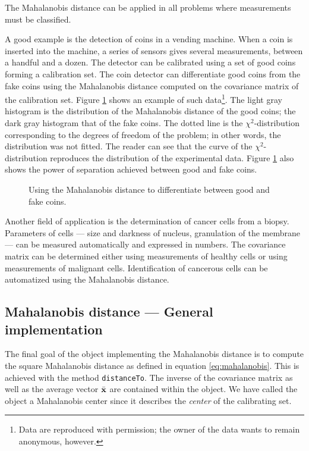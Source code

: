 \documentclass[twoside]{book}
\begin{document}
 \noindent The Mahalanobis distance can
be applied in all problems where measurements must be classified.

A good example is the detection of coins in a vending machine.
When a coin is inserted into the machine, a series of sensors
gives several measurements, between a handful and a dozen. The
detector can be calibrated using a set of good coins forming a
calibration set. The coin detector can differentiate good coins
from the fake coins using the Mahalanobis distance computed on the
covariance matrix of the calibration set. Figure
\ref{fig:mahalanobis} shows an example of such data\footnote{Data
are reproduced with permission; the owner of the data wants to
remain anonymous, however.}. The light gray histogram is the
distribution of the Mahalanobis distance of the good coins; the
dark gray histogram that of the fake coins. The dotted line is the
$\chi^2$-distribution corresponding to the degrees of freedom of
the problem; in other words, the distribution was not fitted. The
reader can see that the curve of the $\chi^2$-distribution
reproduces the distribution of the experimental data. Figure
\ref{fig:mahalanobis} also shows the power of separation achieved
between good and fake coins.
\begin{figure}
\center{}
\caption{Using the Mahalanobis distance to differentiate between
good and fake coins.}\label{fig:mahalanobis}
\end{figure}


Another field of application is the determination of cancer cells
from a biopsy. Parameters of cells --- size and darkness of
nucleus, granulation of the membrane --- can be measured
automatically and expressed in numbers. The covariance matrix can
be determined either using measurements of healthy cells or using
measurements of malignant cells. Identification of cancerous cells
can be automatized using the Mahalanobis distance.

\subsection{Mahalanobis distance --- General implementation}
 The final goal of the object
implementing the Mahalanobis distance is to compute the square
Mahalanobis distance as defined in equation \ref{eq:mahalanobis}.
This is achieved with the method {\tt distanceTo}. The inverse of
the covariance matrix as well as the average vector $\bar{\bf x}$
are contained within the object. We have called the object a
Mahalanobis center since it describes the {\sl center} of the
calibrating set.
\end{document}

